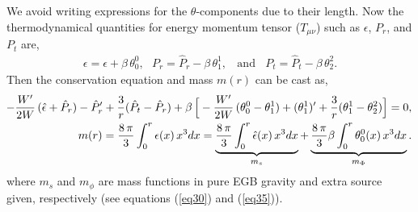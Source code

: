 \documentclass[]{aastex631}
\begin{document}
We avoid writing expressions for the $\theta$-components due to their length. Now the thermodynamical quantities for energy momentum tensor ($T_{\mu\nu}$) such as $\epsilon$, $P_r$, and $P_t$ are,
\begin{eqnarray}
\epsilon=\hat{\epsilon}+\beta\,\theta^0_0,~~~P_r=\hat{P}_r-\beta\,\theta^1_1,~~~~\text{and}~~~~ P_t=\hat{P}_t-\beta\,\theta^2_2 .  \label{eq56}
\end{eqnarray}
Then the conservation equation and mass $m(r)$ can be cast as, 
\begin{eqnarray}
&&\hspace{-0.4cm} -\frac{W^\prime}{2W}\,(\hat{\epsilon}+\hat{P}_r)-\hat{P}_r^\prime+\frac{3}{r}(\hat{P}_t-\hat{P}_r)+\beta\,\Big[-\frac{W^\prime}{2W}\,(\theta^0_0-\theta^1_1) +(\theta^1_1)^\prime+\frac{3}{r}(\theta^1_1-\theta^2_2)\Big]=0,  \label{eq57}\\
&&\hspace{-0.4cm} m(r)= \frac{8\,\pi}{3} \int_0^r \epsilon(x)\,x^3 dx=\underbrace{\frac{8\,\pi}{3} \int_0^r \hat{\epsilon}(x)\,x^3 dx}_{m_s}  +\underbrace{\frac{8\,\pi}{3} \beta \int_0^r \theta^0_0(x)\,x^3 dx}_{m_{\Phi}}.  \label{eq58}
\end{eqnarray}
where $m_s$ and $m_{\phi}$ are mass functions in pure EGB gravity and extra source given, respectively (see equations (\ref{eq30}) and (\ref{eq35})). 
\end{document}
